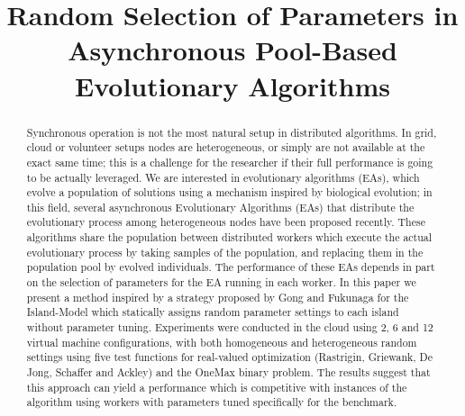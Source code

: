 \documentclass[conference]{IEEEtran}
\begin{document}
\title{Random Selection of Parameters in Asynchronous Pool-Based Evolutionary Algorithms\\
}

\author{
  \and
}

\maketitle

\begin{abstract}
  Synchronous operation is not the most natural setup in distributed
algorithms. In grid, cloud or volunteer setups nodes are
heterogeneous, or simply are not available at the exact same time;
this is a challenge for the researcher if their full performance is
going to be actually leveraged. We are interested in evolutionary
algorithms (EAs), which evolve a population of solutions using a
mechanism inspired by biological evolution; in this field, several
asynchronous Evolutionary Algorithms (EAs) that distribute the
evolutionary process among heterogeneous nodes have been proposed
recently. These algorithms share the population between distributed
workers which execute the actual evolutionary process by taking
samples of the population, and replacing them in the population pool
by evolved individuals. The performance of these EAs depends in part
on the selection of parameters for the EA running in each worker. In
this paper we present a method inspired by a strategy proposed by Gong
and Fukunaga for the Island-Model which statically assigns random
parameter settings to each island without parameter
tuning. Experiments were conducted in the cloud using 2, 6 and 12
virtual machine configurations, with both homogeneous and
heterogeneous random settings using five test functions for
real-valued optimization (Rastrigin, Griewank, De Jong, Schaffer and
Ackley) and the OneMax binary problem. The results suggest that this
approach can yield a performance which is competitive with instances
of the algorithm using workers with parameters tuned specifically for
the benchmark.
\end{abstract}
\end{document}
